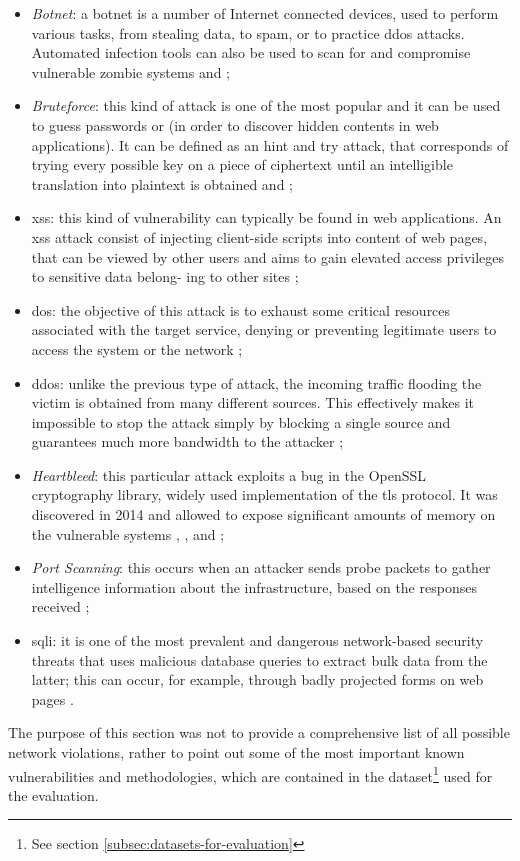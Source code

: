 \begin{itemize}
    \item[\faCaretRight] \textit{Botnet}: a botnet is a number of Internet connected devices, used to perform various tasks, from stealing data, to spam, or to practice \gls{ddos} attacks. Automated infection tools can also be used to scan for and compromise vulnerable zombie systems \cite[p.~250]{Sharafaldin2019} and \cite{icissp18};
    \item[\faCaretRight] \textit{Bruteforce}: this kind of attack is one of the most popular and it can be used to guess passwords or  (in order to discover hidden contents in web applications). It can be defined as an hint and try attack, that corresponds of trying every possible key on a piece of ciphertext until an intelligible translation into plaintext is obtained \cite[p.~43]{Sharafaldin2019} and \cite{icissp18};
    \item[\faCaretRight] \gls{xss}: this kind of vulnerability can typically be found in web applications. An \gls{xss} attack consist of injecting client-side scripts into  content of web pages, that can be viewed by other users and aims to gain elevated access privileges to sensitive data belong- ing to other sites \cite[p.~387]{Sharafaldin2019};
    \item[\faCaretRight] \gls{dos}: the objective of this attack is to exhaust some critical resources associated with the target service, denying or preventing legitimate users to access the system or the network \cite[p.~241]{Sharafaldin2019};
    \item[\faCaretRight] \gls{ddos}: unlike the previous type of attack, the incoming traffic flooding the victim is obtained from many different sources. This effectively makes it impossible to stop the attack simply by blocking a single source and guarantees much more bandwidth to the attacker \cite[p.~241]{Sharafaldin2019};
    \item[\faCaretRight] \textit{Heartbleed}: this particular attack exploits a bug in the OpenSSL cryptography library, widely used implementation of the \gls{tls} protocol. It was discovered in 2014 and allowed to expose significant amounts of memory on the vulnerable systems \cite{Carvalho2014}, \cite[p.~706]{Sharafaldin2019}, \cite{icissp18} and \cite{Stallings2014};
    \item[\faCaretRight] \textit{Port Scanning}: this occurs when an attacker sends probe packets to gather intelligence information about the infrastructure, based on the responses received \cite{icissp18};
    \item[\faCaretRight] \gls{sqli}: it is one of the most prevalent and dangerous network-based security threats that uses malicious database queries to extract bulk data from the latter; this can occur, for example, through badly projected forms on web pages \cite[p.~163]{Sharafaldin2019}.
\end{itemize}
The purpose of this section was not to provide a comprehensive list of all possible network violations, rather to point out some of the most important known vulnerabilities and methodologies, which are contained in the dataset\footnote{See section \ref{subsec:datasets-for-evaluation}} used for the evaluation.

